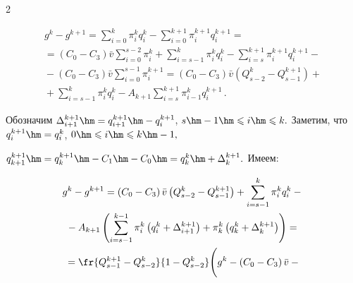 \begin{multicols}{2}
{\begin{multline*}


g^k-g^{k+1}=\sum\limits_{i=0}^{k}\pi_i^{k}q_i^{k}-


\sum\limits_{i=0}^{k+1}\pi_i^{k+1}q_i^{k+1}={}\\


{}=


\left(C_0-C_3\right)\bar{v}\sum\limits_{i=0}^{s-2}\pi_i^k+


\sum\limits_{i=s-1}^{k}\pi_i^kq_i^k


-\sum\limits_{i=s}^{k+1}\pi_i^{k+1}q_i^{k+1}-{}


\\


{}-\left(C_0-C_3\right)\bar{v}\sum\limits_{i=0}^{s-1}


\pi_i^{k+1}=\left(C_0-C_3\right)\bar{v}\left(Q_{s-2}^k-Q_{s-1}^{k+1}\right)+{}\\


{}+


\sum\limits_{i=s-1}^{k}\pi_i^kq_i^k-A_{k+1}


\sum\limits_{i=s}^{k+1}\pi_{i-1}^kq_i^{k+1}\,.


\end{multline*}





Обозначим $\Delta_{i+1}^{k+1}\hm=q_{i+1}^{k+1}\hm-q_{i}^{k+1}$, $s\hm-1\hm\leqslant


i\hm\leqslant k.$ Заметим, что $q_i^{k+1}\hm=q_i^k$, $0\hm\leqslant i\hm\leqslant k\hm-1,$


$q_{k+1}^{k+1}\hm=q_k^{k+1}\hm-C_1\hm-C_0\hm=q_k^{k}\hm+\Delta_k^{k+1}.$ Имеем:


\begin{multline*}


g^k-g^{k+1}=\left(C_0-C_3\right)\bar{v}\left(


Q_{s-2}^k-Q_{s-1}^{k+1}\right)+


\sum\limits_{i=s-1}^k\pi_i^kq_i^k-{}\\


{}- A_{k+1}


\left(\sum\limits_{i=s-1}^{k-1}\pi_i^k\left(q_i^k+\Delta_{i+1}^{k+1}\right)+


\pi_k^k\left(q_k^k+\Delta_k^{k+1}\right)\right)={}\\


{}=


\fr{Q_{s-1}^{k+1}-Q_{s-2}^k}{1-Q_{s-2}^k}


\Bigg(g^k-\left(C_0-C_3\right)\bar{v}-{}\\



\end{multline*}}
\end{multicols}

